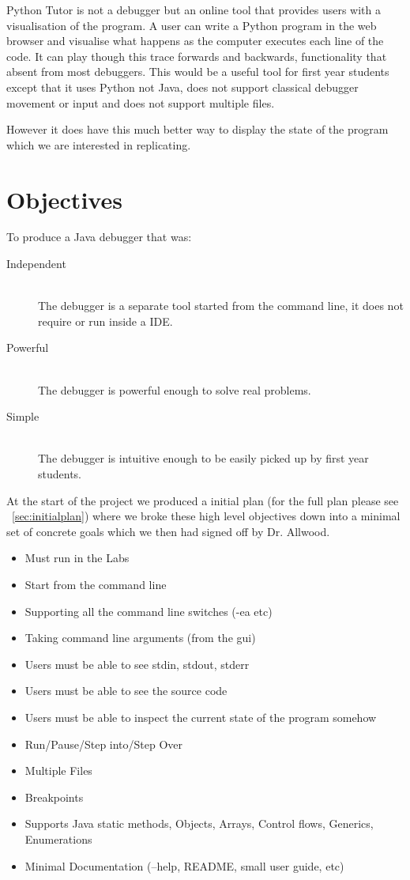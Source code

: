 \documentclass[11pt, a4paper]{article}
\begin{document}
Python Tutor is not a debugger but an online tool that provides users with a visualisation of the program.
A user can write a Python program in the web browser and visualise what happens as the computer executes each line of the code.
It can play though this trace forwards and backwards, functionality that absent from most debuggers.
This would be a useful tool for first year students except that it uses Python not Java, does not support classical debugger movement or input and does not support multiple files.

However it does have this much better way to display the state of the program which we are interested in replicating.


\section{Objectives} 

To produce a Java debugger that was:

\begin{description}
\item[Independent] \hfill \\
The debugger is a separate tool started from the command line, it does not require or run inside a IDE.
\item[Powerful] \hfill \\
The debugger is powerful enough to solve real problems.
\item[Simple] \hfill \\
The debugger is intuitive enough to be easily picked up by first year students.
\end{description}

At the start of the project we produced a initial plan (for the full plan please see ~\cref{sec:initialplan}) where we broke these high level objectives down into a minimal set of concrete goals which we then had signed off by Dr. Allwood.

\begin{itemize}
\item Must run in the Labs
\item Start from the command line
\item Supporting all the command line switches (-ea etc)
\item Taking command line arguments (from the gui)
\item Users must be able to see stdin, stdout, stderr
\item Users must be able to see the source code
\item Users must be able to inspect the current state of the program somehow
\item Run/Pause/Step into/Step Over
\item Multiple Files
\item Breakpoints
\item Supports Java static methods, Objects, Arrays, Control flows, Generics, Enumerations
\item Minimal Documentation (--help, README, small user guide, etc)
\end{itemize}
\end{document}
